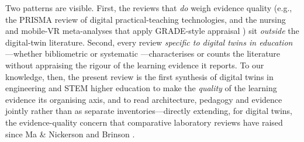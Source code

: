 \normalsize



Two patterns are visible. First, the reviews that \emph{do} weigh evidence quality
(e.g., the PRISMA review of digital practical-teaching technologies, and the
nursing and mobile-VR meta-analyses that apply GRADE-style appraisal
\cite{maladzhi_digital_2025,li_effects_2026,widowati_meta-analysis_2025}) sit
\emph{outside} the digital-twin literature. Second, every review \emph{specific to digital
twins in education}---whether bibliometric \cite{chamorro-atalaya_use_2024,vergara_decade_2025} or systematic \cite{kumar_karanam_systematic_2025,omrany_digital_2026}---characterises or counts the literature without appraising the
rigour of the learning evidence it reports. To our knowledge, then, the present
review is the first synthesis of digital twins in engineering and STEM higher
education to make the \emph{quality} of the learning evidence its organising axis, and to
read architecture, pedagogy and evidence jointly rather than as separate
inventories---directly extending, for digital twins, the evidence-quality concern
that comparative laboratory reviews have raised since Ma \& Nickerson and Brinson
\cite{ma_handson_2006,brinson_learning_2015,heradio_virtual_2016}.

